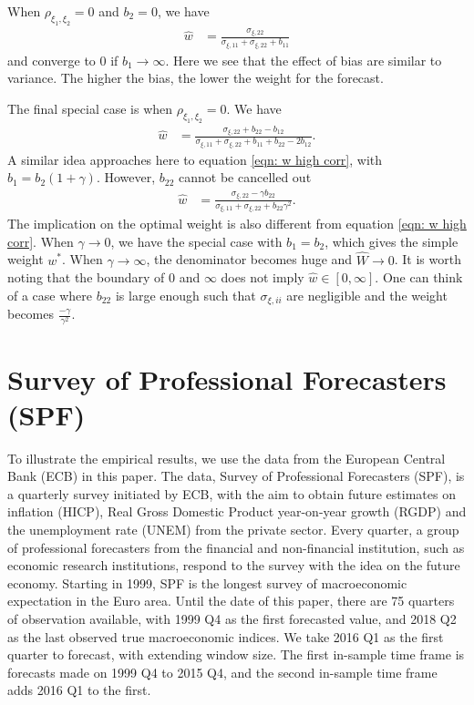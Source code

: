 \documentclass[11pt]{article}
\begin{document}
When $\rho_{\xi_1,\xi_2}=0$ and $b_2=0$, we have
\begin{equation}
\begin{aligned}
\hat{w} &= \frac{\sigma_{\xi,22}}{\sigma_{\xi,11}+\sigma_{\xi,22}+b_{11}}
\end{aligned}
\end{equation}
and converge to 0 if $b_1 \to \infty$. Here we see that the effect of bias are similar to variance. The higher the bias, the lower the weight for the forecast.

The final special case is when $\rho_{\xi_1,\xi_2}=0$. We have
\begin{equation}
\begin{aligned}
\hat{w} &= \frac{\sigma_{\xi,22}+b_{22}-b_{12}}{\sigma_{\xi,11}+\sigma_{\xi,22}+b_{11}+b_{22}-2b_{12}}.
\end{aligned}
\end{equation}
A similar idea approaches here to equation \ref{eqn: w high corr}, with $b_1 = b_2 (1+\gamma)$. However, $b_{22}$ cannot be cancelled out
\begin{equation}
\begin{aligned}
\hat{w} &= \frac{\sigma_{\xi,22}-\gamma b_{22}}{\sigma_{\xi,11}+\sigma_{\xi,22}+b_{22}\gamma^2}.
\end{aligned}
\end{equation}
The implication on the optimal weight is also different from equation \ref{eqn: w high corr}. When $\gamma \to 0$, we have the special case with $b_1=b_2$, which gives the simple weight $w^*$. When $\gamma \to \infty$, the denominator becomes huge and $\hat{W} \to 0$. It is worth noting that the boundary of 0 and $\infty$ does not imply $\hat{w} \in [0,\infty]$. One can think of a case where $b_{22}$ is large enough such that $\sigma_{\xi,ii}$ are negligible and the weight becomes $\frac{-\gamma}{\gamma^2}$. 



\section{Survey of Professional Forecasters (SPF)}\label{survey-of-professional-forecasters-spf}

To illustrate the empirical results, we use the data from the European Central Bank (ECB) in this paper. The data, Survey of Professional Forecasters (SPF), is a quarterly survey initiated by ECB, with the aim to obtain future estimates on inflation (HICP), Real Gross Domestic Product year-on-year growth (RGDP) and the unemployment rate (UNEM) from the private sector. Every quarter, a group of professional forecasters from the financial and non-financial institution, such as economic research institutions, respond to the survey with the idea on the future economy. Starting in 1999, SPF is the longest survey of macroeconomic expectation in the Euro area. Until the date of this paper, there are 75 quarters of observation available, with 1999 Q4 as the first forecasted value, and 2018 Q2 as the last observed true macroeconomic indices. We take 2016 Q1 as the first quarter to forecast, with extending window size. The first in-sample time frame is forecasts made on 1999 Q4 to 2015 Q4, and the second in-sample time frame adds 2016 Q1 to the first.
\end{document}
